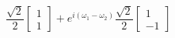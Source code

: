 \documentclass[preview]{standalone}
\begin{document}
\begin{center}
$\dfrac{\sqrt{2}}{2} \begin{bmatrix} 1 \\ 1\end{bmatrix} + e^{i(\omega_1-\omega_2)}\dfrac{\sqrt{2}}{2} \begin{bmatrix} 1 \\ -1\end{bmatrix}$
\end{center}
\end{document}
